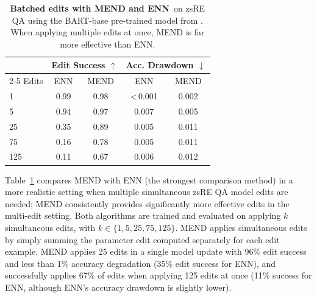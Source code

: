 \documentclass{article}
\makeatletter
\newcommand{\name}{MEND}
\newcommand{\rebuttal}[1]{#1}
\newcommand{\textlt}[1]{\textless\,#1\phantom{\textless\,}}
\let\origsubsection\subsection
\renewcommand\subsection{\@ifstar{\starsubsection}{\nostarsubsection}}
\newcommand\nostarsubsection[1]
{\subsectionprelude\origsubsection{#1}\subsectionpostlude}
\newcommand\starsubsection[1]
{\subsectionprelude\origsubsection*{#1}\subsectionpostlude}
\newcommand\subsectionprelude{%
  \vspace{-1.5mm}
}
\newcommand\subsectionpostlude{%
  \vspace{-1.5mm}
}
\makeatother
\begin{document}
\subsection{Batched Editing}


\begin{table}
    \centering
    \small
    \vspace{-6mm}
    \begin{tabular}{lcccc}
        \toprule
        & \multicolumn{2}{c}{Edit Success $\uparrow$} & \multicolumn{2}{c}{Acc. Drawdown $\downarrow$} \\
        \cmidrule{2-5}
        Edits & \rebuttal{ENN} & \name & \rebuttal{ENN} & \name \\
        \midrule
        1 & \rebuttal{0.99} & 0.98 & \rebuttal{\textlt{0.001}} & 0.002 \\
        5 & \rebuttal{0.94} & 0.97 & \rebuttal{0.007} & 0.005 \\
        25 & \rebuttal{0.35} & 0.89 & \rebuttal{0.005} & 0.011 \\
        75 & \rebuttal{0.16} & 0.78 & \rebuttal{0.005} & 0.011 \\
        125 & \rebuttal{0.11} & 0.67 & \rebuttal{0.006} & 0.012 \\
        \bottomrule
    \end{tabular}
    \caption{\rebuttal{\textbf{Batched edits with {\name} and ENN}~on zsRE QA using the BART-base pre-trained model from \citet{Cao2021EditingFK}. When applying multiple edits at once, {\name} is far more effective than ENN.}}
    \label{tab:batched-edits}
\end{table}

\rebuttal{Table~\ref{tab:batched-edits} compares {\name} with ENN (the strongest comparison method) in a more realistic setting when multiple simultaneous zsRE QA model edits are needed; {\name} consistently provides significantly more effective edits in the multi-edit setting. Both algorithms are trained and evaluated on applying $k$ simultaneous edits, with $k\in\{1,5,25,75,125\}$. {\name} applies simultaneous edits by simply summing the parameter edit computed separately for each edit example. {\name} applies 25 edits in a single model update with 96\% edit success and less than 1\% accuracy degradation (35\% edit success for ENN), and successfully applies 67\% of edits when applying 125 edits at once (11\% success for ENN, although ENN's accuracy drawdown is slightly lower).}
\end{document}
